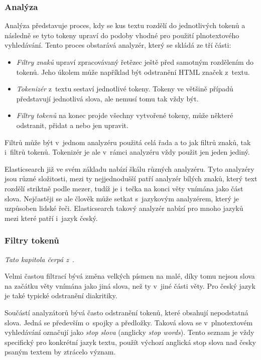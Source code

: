 \subsubsection*{Analýza}
Analýza představuje proces, kdy se kus textu rozdělí do jednotlivých tokenů a následně se tyto tokeny upraví do podoby vhodné pro použití plnotextového vyhledávání. Tento proces obstarává analyzér, který se skládá ze tří části:
\begin{itemize}
    \item \emph{Filtry znaků} upraví zpracovávaný řetězec ještě před samotným rozdělením do tokenů. Jeho úkolem může například být odstranění HTML značek z~textu.
    \item \emph{Tokenizér} z~textu sestaví jednotlivé tokeny. Tokeny ve většině případů představují jednotlivá slova, ale nemusí tomu tak vždy být. 
    \item \emph{Filtry tokenů} na konec projde všechny vytvořené tokeny, může některé odstranit, přidat a nebo jen upravit. 
\end{itemize}
Filtrů může být v~jednom analyzéru použitá celá řada a to jak filtrů znaků, tak i~filtrů tokenů. Tokenizér je ale v~rámci analyzéru vždy použit jen jeden jediný.

Elasticsearch již ve svém základu nabízí škálu různých analyzéru. Tyto analyzéry jsou různé složitosti, mezi ty nejjednodušší patří analyzér bílých znaků, který text rozdělí striktně podle mezer, tudíž je i~tečka na konci věty vnímána jako část slova. Nejčastěji se ale člověk může setkat s~jazykovým analyzérem, který je uzpůsoben lidské řeči. Elasticsearch takový analyzér nabízí pro mnoho jazyků mezi které patří i~jazyk český.

\subsubsection*{Filtry tokenů}
\emph{Tato kapitola čerpá z~\cite{bib:elastic-fulltext}}.

Velmi častou filtrací bývá změna velkých písmen na malé, díky tomu nejsou slova na začátku věty vnímána jako jiná slova, než ty v~jiné části věty. Pro český jazyk je také typické odstranění diakritiky.

Součástí analyzátorů bývá často odstranění tokenů, které obsahují nepodstatná slova. Jedná se především o~spojky a předložky. Taková slova se v~plnotextovém vyhledávání označují jako \emph{stop slova} (anglicky \emph{stop words}). Tento seznam je vždy specifický pro konkrétní jazyk textu, použít výchozí anglická stop slova nad česky psaným textem by ztrácelo význam.

